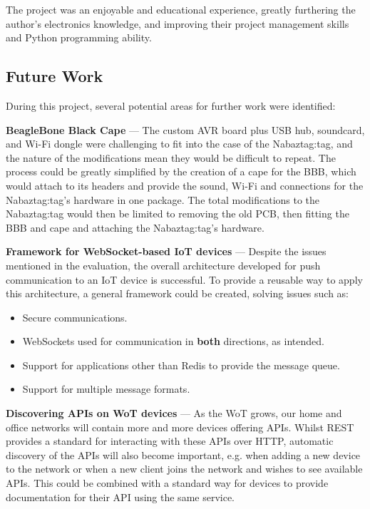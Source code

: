 \documentclass[12pt, a4paper]{article}
\begin{document}
		 The project was an enjoyable and educational experience, greatly furthering the author's electronics knowledge, and improving their project management skills and Python programming ability. 
	
	\subsection{Future Work}\label{sec:futurework}
	
		During this project, several potential areas for further work were identified:
		
		\textbf{BeagleBone Black Cape} --- The custom AVR board plus \ac{USB} hub, soundcard, and Wi-Fi dongle were challenging to fit into the case of the Nabaztag:tag, and the nature of the modifications mean they would be difficult to repeat. The process could be greatly simplified by the creation of a cape for the \ac{BBB}, which would attach to its headers and provide the sound, Wi-Fi and connections for the Nabaztag:tag's hardware in one package. The total modifications to the Nabaztag:tag would then be limited to removing the old \ac{PCB}, then fitting the \ac{BBB} and cape and attaching the Nabaztag:tag's hardware.
		
		\textbf{Framework for WebSocket-based \ac{IoT} devices} --- Despite the issues mentioned in the evaluation, the overall architecture developed for push communication to an \ac{IoT} device is successful. To provide a reusable way to apply this architecture, a general framework could be created, solving issues such as:
		
			\begin{itemize}
				\item Secure communications.
				\item WebSockets used for communication in \textbf{both} directions, as intended.
				\item Support for applications other than Redis to provide the message queue.
				\item Support for multiple message formats.
			\end{itemize}
			
		\textbf{Discovering \ac{API}s on \ac{WoT} devices} --- As the \ac{WoT} grows, our home and office networks will contain more and more devices offering \acp{API}. Whilst \ac{REST} provides a standard for interacting with these \acp{API} over \ac{HTTP}, automatic discovery of the \acp{API} will also become important, e.g. when adding a new device to the network or when a new client joins the network and wishes to see available \acp{API}. This could be combined with a standard way for devices to provide documentation for their \ac{API} using the same service.
	
\end{document}
